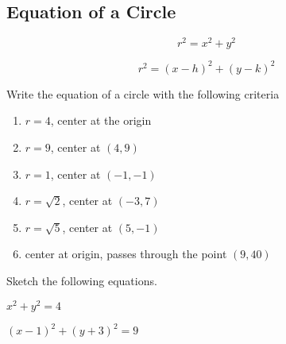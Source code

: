 \documentclass[12pt]{article}
\begin{document}
\pagebreak

\subsection*{Equation of a Circle}

$$r^2=x^2+y^2$$

$$r^2=(x-h)^2+(y-k)^2$$

Write the equation of a circle with the following criteria\\

\begin{enumerate}[resume]

	\item $r=4$, center at the origin\\
	
	\item $r=9$, center at $(4,9)$\\
	
	\item $r=1$, center at $(-1,-1)$\\
	
	\item $r=\sqrt{2}$, center at $(-3,7)$\\
	
	\item $r=\sqrt{5}$, center at $(5,-1)$\\
	
	\item center at origin, passes through the point $(9,40)$\\
	
	
\end{enumerate}

\hrulefill

Sketch the following equations.\\

\begin{enumerate}[resume]
\begin{multicols}{2}

	\item $x^2+y^2=4$\\
	
	\graph
	
	\item $(x-1)^2+(y+3)^2=9$\\
	
	\graph

\end{multicols}
\end{enumerate}
\end{document}
